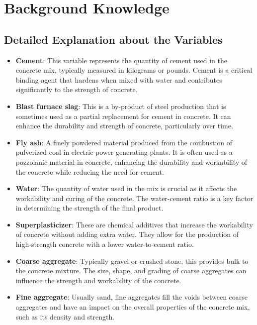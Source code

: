\documentclass{article}
\begin{document}
\section{Background Knowledge}
\subsection{Detailed Explanation about the Variables}
\begin{itemize}
    \item \textbf{Cement}: This variable represents the quantity of cement used in the concrete mix, typically measured in kilograms or pounds. Cement is a critical binding agent that hardens when mixed with water and contributes significantly to the strength of concrete.
    
    \item \textbf{Blast furnace slag}: This is a by-product of steel production that is sometimes used as a partial replacement for cement in concrete. It can enhance the durability and strength of concrete, particularly over time.
    
    \item \textbf{Fly ash}: A finely powdered material produced from the combustion of pulverized coal in electric power generating plants. It is often used as a pozzolanic material in concrete, enhancing the durability and workability of the concrete while reducing the need for cement.
    
    \item \textbf{Water}: The quantity of water used in the mix is crucial as it affects the workability and curing of the concrete. The water-cement ratio is a key factor in determining the strength of the final product.
    
    \item \textbf{Superplasticizer}: These are chemical additives that increase the workability of concrete without adding extra water. They allow for the production of high-strength concrete with a lower water-to-cement ratio.
    
    \item \textbf{Coarse aggregate}: Typically gravel or crushed stone, this provides bulk to the concrete mixture. The size, shape, and grading of coarse aggregates can influence the strength and workability of the concrete.
    
    \item \textbf{Fine aggregate}: Usually sand, fine aggregates fill the voids between coarse aggregates and have an impact on the overall properties of the concrete mix, such as its density and strength.
    

\end{itemize}
\end{document}
